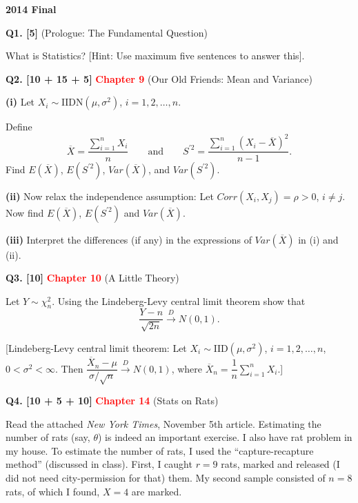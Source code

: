\documentclass[11pt]{article}
\begin{document}
\begin{center}
    {\Large\bfseries 2014 Final}
\end{center}

\vspace{1em}

\textbf{Q1. [5]} (Prologue: The Fundamental Question)

What is Statistics? [Hint: Use maximum five sentences to answer this].

\bigskip

\textbf{Q2. [10 + 15 + 5]} \textbf{\textcolor{red}{Chapter 9}} (Our Old Friends: Mean and Variance)

\textbf{(i)} Let $X_i\sim\mathrm{IIDN}(\mu,\sigma^2)$, $i=1,2,\ldots,n$.

Define
\[
\overline X=\frac{\sum_{i=1}^{n}X_i}{n}
\qquad\text{and}\qquad
S^{\prime 2}=\frac{\sum_{i=1}^{n}(X_i-\overline X)^2}{n-1}.
\]
Find $E(\overline X)$, $E(S^{\prime 2})$, $Var(\overline X)$, and $Var(S^{\prime 2})$.

\textbf{(ii)} Now relax the independence assumption: Let $Corr(X_i,X_j)=\rho>0$, $i\neq j$. Now find $E(\overline X)$, $E(S^{\prime 2})$ and $Var(\overline X)$.

\textbf{(iii)} Interpret the differences (if any) in the expressions of $Var(\overline X)$ in (i) and (ii).

\bigskip

\textbf{Q3. [10]} \textbf{\textcolor{red}{Chapter 10}} (A Little Theory)

Let $Y\sim\chi_n^2$. Using the Lindeberg-Levy central limit theorem show that
\[
\frac{Y-n}{\sqrt{2n}}\overset{D}{\longrightarrow}N(0,1).
\]

[Lindeberg-Levy central limit theorem: Let $X_i\sim\mathrm{IID}(\mu,\sigma^2)$, $i=1,2,\ldots,n$, $0<\sigma^2<\infty$. Then
$\dfrac{\overline X_n-\mu}{\sigma/\sqrt n}\overset{D}{\longrightarrow}N(0,1)$, where $\overline X_n=\dfrac{1}{n}\sum_{i=1}^{n}X_i$.]

\bigskip

\textbf{Q4. [10 + 5 + 10]} \textbf{\textcolor{red}{Chapter 14}} (Stats on Rats)

Read the attached \emph{New York Times}, November 5th article. Estimating the number of rats (say, $\theta$) is indeed an important exercise. I also have rat problem in my house. To estimate the number of rats, I used the ``capture-recapture method'' (discussed in class). First, I caught $r=9$ rats, marked and released (I did not need city-permission for that) them. My second sample consisted of $n=8$ rats, of which I found, $X=4$ are marked.
\end{document}
